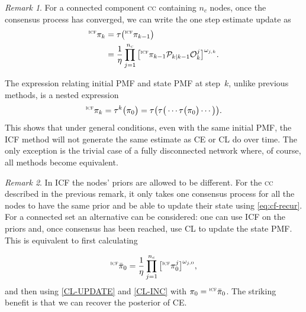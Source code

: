 \documentclass[journal]{IEEEtran}
\theoremstyle{remark}
\newtheorem{remark}{Remark}
\newcommand{\suf}[1]{\textsc{\tiny #1}}  %
\theoremstyle{definition}
\begin{document}
\begin{remark}
For a connected component \textsc{cc} containing $n_{c}$ nodes, once
the consensus process has converged, we can write the one step estimate update
as 
\begin{align}
\label{eq:cf-recur}
{}^{\suf{ICF}}{\pi}_{k} &= \tau\big({}^{\suf{ICF}}{\pi}_{k-1}\big) \nonumber\\
&= \frac{1}{\eta}\prod_{j = 1}^{n_{c}}  \big[{}^{\suf{ICF}}{\pi}_{k-1}\mathcal{P}_{k\vert k-1}\mathcal{O}_k^j\big]^{\omega_{j,k}}.
\end{align} 

The expression relating initial PMF and state PMF at step~$k$, unlike previous methods, is a nested expression
\begin{equation}
\label{eq:icfprop}
{}^{\suf{ICF}}{\pi}_{k} = \tau^k\big({\pi}_{0}\big)=\tau\big(\tau\big(\cdots\tau\big({\pi}_{0}\big)\cdots\big)\big). \\
\end{equation}
This shows that under general conditions, even with the same initial PMF,
the ICF method will not generate the same estimate as CE or CL do over
time. The only exception is the trivial case of a fully disconnected network
where, of course, all methods become equivalent.
\end{remark}

\begin{remark}
In ICF the nodes' priors are allowed to be different. For the \textsc{cc} 
described in the previous remark, it only takes one consensus process for all
the nodes to have the same prior and be able to update their state using
\eqref{eq:cf-recur}. For a connected set an alternative can be considered:
one can use ICF on the priors and, once consensus has been reached, use CL to
update the state PMF. This is equivalent to first calculating  

\begin{equation}
{}^{\suf{ICF}}\bar{\pi}_{0} = \frac{1}{\eta}\prod_{j = 1}^{n_{c}}  \big[{}^{\suf{ICF}}{\pi}^j_{0}\big]^{\omega_{j,0}}, 
\end{equation} 
and then using \eqref{CL-UPDATE} and \eqref{CL-INC} with $\pi_0 =
{}^{\suf{ICF}}\bar{\pi}_{0}$. The striking benefit is that we can 
recover the posterior of CE. 
\end{remark}
\end{document}
